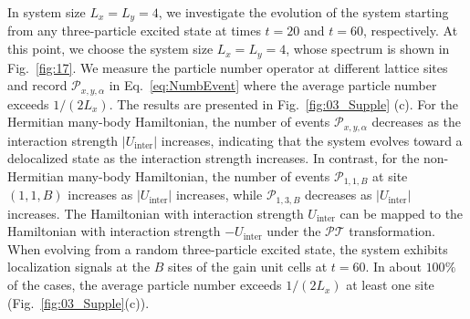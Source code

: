 \documentclass[longbibliography, aps, prx, amsmath, amssymb, amsfonts, twocolumn,superscriptaddress, footinbib]{revtex4-1}
\begin{document}
	In system size $L_x = L_y = 4$, we investigate the evolution of the system starting from any three-particle excited state at times $t = 20$ and $t = 60$, respectively. 
	At this point, we choose the system size $L_x=L_y=4$, whose spectrum is shown in Fig.~\ref{fig:17}. 
	We measure the particle number operator at different lattice sites and record $\mathcal{P}_{x,y,\alpha}$ in Eq.~\eqref{eq:NumbEvent} where the average particle number exceeds $1/(2L_x)$. The results are presented in Fig.~\ref{fig:03_Supple} (c).
	For the Hermitian many-body Hamiltonian, the number of events $\mathcal{P}_{x,y,\alpha}$ decreases as the interaction strength $\vert U_{\text{inter}}\vert $ increases, indicating that the system evolves toward a delocalized state as the interaction strength increases. 
	In contrast, for the non-Hermitian many-body Hamiltonian, the number of events $\mathcal{P}_{1,1,B}$ at site $(1,1,B)$ increases as $\vert U_{\text{inter}}\vert$ increases, while $\mathcal{P}_{1,3,B}$ decreases as $\vert U_{\text{inter}}\vert$ increases. 
	The Hamiltonian with interaction strength $U_{\text{inter}}$ can be mapped to the Hamiltonian with interaction strength $-U_{\text{inter}}$ under the $\mathcal{PT}$ transformation.
	When evolving from a random three-particle excited state, the system exhibits localization signals at the $B$ sites of the gain unit cells at $t=60$.
	In about $100\%$ of the cases, the average particle number exceeds $1/(2L_x)$ at least one site (Fig.~\ref{fig:03_Supple}(c)).
\end{document}

